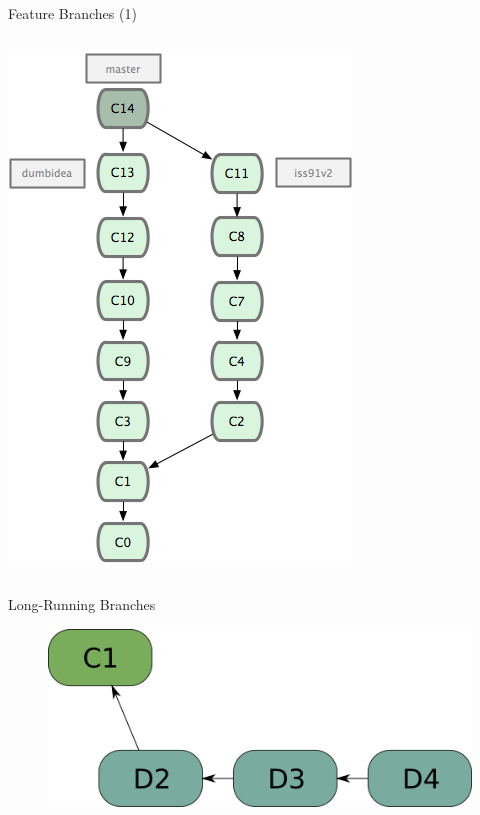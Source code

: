 \documentclass{beamer}
\begin{document}
\begin{frame}{Feature Branches (1)}
\begin{columns}[T]
\begin{column}{.45\textwidth}
\begin{block}{}
        \pause \includegraphics[scale=0.6]{images/feature-branches2.png}
    \end{block}
  \end{column}
\end{columns}  
\end{frame}

\begin{frame}{Long-Running Branches}
\begin{figure} 
\centering
  \includegraphics[scale=0.5]{images/long-running-branch.png}
\end{figure}
\end{frame}
\end{document}
